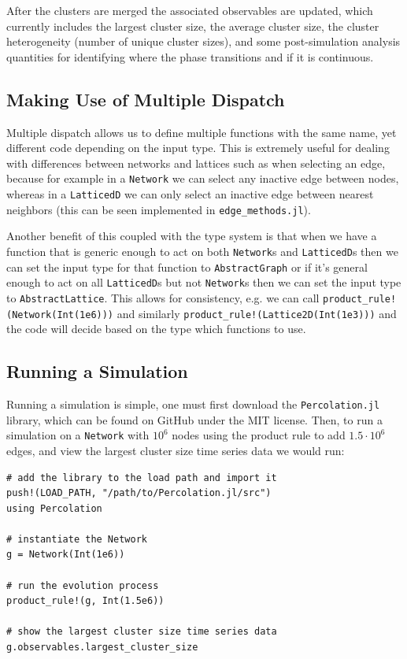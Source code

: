 After the clusters are merged the associated observables are updated, which currently includes the largest cluster size, the average cluster size, the cluster heterogeneity (number of unique cluster sizes), and some post-simulation analysis quantities for identifying where the phase transitions and if it is continuous.

\subsection{Making Use of Multiple Dispatch}
Multiple dispatch allows us to define multiple functions with the same name, yet different code depending on the input type.
This is extremely useful for dealing with differences between networks and lattices such as when selecting an edge, because for example in a \texttt{Network} we can select any inactive edge between nodes, whereas in a \texttt{LatticedD} we can only select an inactive edge between nearest neighbors (this can be seen implemented in \texttt{edge\_methods.jl}).

Another benefit of this coupled with the type system is that when we have a function that is generic enough to act on both \texttt{Network}s and \texttt{LatticedD}s then we can set the input type for that function to \texttt{AbstractGraph} or if it's general enough to act on all \texttt{LatticedD}s but not \texttt{Network}s then we can set the input type to \texttt{AbstractLattice}.
This allows for consistency, e.g. we can call \texttt{product\_rule!(Network(Int(1e6)))} and similarly \texttt{product\_rule!(Lattice2D(Int(1e3)))} and the code will decide based on the type which functions to use.

\subsection{Running a Simulation}
Running a simulation is simple, one must first download the \texttt{Percolation.jl} library, which can be found on GitHub under the MIT license.
Then, to run a simulation on a \texttt{Network} with $10^6$ nodes using the product rule to add $1.5 \cdot 10^6$ edges, and view the largest cluster size time series data we would run:

\begin{lstlisting}
# add the library to the load path and import it
push!(LOAD_PATH, "/path/to/Percolation.jl/src")
using Percolation

# instantiate the Network
g = Network(Int(1e6))

# run the evolution process
product_rule!(g, Int(1.5e6))

# show the largest cluster size time series data
g.observables.largest_cluster_size
\end{lstlisting}
